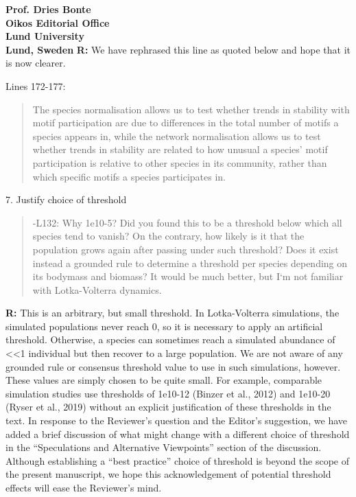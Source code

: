 \documentclass[12pt]{letter}
\begin{document}
\begin{letter}{\bf Prof. Dries Bonte\\
Oikos Editorial Office \\
Lund University \\
Lund, Sweden}
      \textbf{R:} We have rephrased this line as quoted below and hope that it is now clearer.

    
        Lines 172-177:
        
        \begin{quotation}
    		The species normalisation allows us to test whether trends in stability with motif participation are due to differences in the total number of motifs a species appears in, while the network normalisation allows us to test whether trends in stability are related to how unusual a species' motif participation is relative to other species in its community, rather than which specific motifs a species participates in.
        \end{quotation}


    7. Justify choice of threshold 
        
        \begin{quotation}
        -L132: Why 1e10-5? Did you found this to be a threshold below which all species tend to vanish? On the contrary, how likely is it that the population grows again after passing under such threshold? Does it exist instead a grounded rule to determine a threshold per species depending on its bodymass and biomass? It would be much better, but I`m not familiar with Lotka-Volterra dynamics.
        \end{quotation}

        \textbf{R:} This is an arbitrary, but small threshold. In Lotka-Volterra simulations, the simulated populations never reach 0, so it is necessary to apply an artificial threshold. Otherwise, a species can sometimes reach a simulated abundance of <<1 individual but then recover to a large population.
        We are not aware of any grounded rule or consensus threshold value to use in such simulations, however. These values are simply chosen to be quite small. For example, comparable simulation studies use thresholds of 1e10-12 (Binzer et al., 2012) and 1e10-20 (Ryser et al., 2019) without an explicit justification of these thresholds in the text. 
        In response to the Reviewer's question and the Editor's suggestion, we have added a brief discussion of what might change with a different choice of threshold in the ``Speculations and Alternative Viewpoints'' section of the discussion. 
        Although establishing a ``best practice'' choice of threshold is beyond the scope of the present manuscript, we hope this acknowledgement of potential threshold effects will ease the Reviewer's mind.
        


\end{letter}
\end{document}

